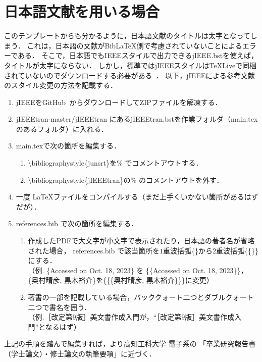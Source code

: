 \chapter{日本語文献を用いる場合}
このテンプレートからも分かるように，日本語文献のタイトルは太字となってしまう．
これは，日本語の文献がBib{\LaTeX}側で考慮されていないことによるエラーである．
そこで，日本語でもIEEEスタイルで出力できるjIEEE.bstを使えば，タイトルが太字にならない．
しかし，標準ではjIEEEスタイルは\TeX Liveで同梱されていないのでダウンロードする必要がある~\cite{jieeetran}．
以下，jIEEEによる参考文献のスタイル変更の方法を記載する．

\begin{enumerate}
    \item jIEEEをGitHub~\cite{jieeetran}からダウンロードしてZIPファイルを解凍する．
    \item jIEEEtran-master/jIEEEtran にあるjIEEEtran.bstを作業フォルダ（main.texのあるフォルダ）に入れる．
    \item main.texで次の箇所を編集する．
        \begin{enumerate}
            \item \textbackslash bibliographystyle\{junsrt\}を\% でコメントアウトする．
            \item \textbackslash bibliographystyle\{jIEEEtran\}の\% のコメントアウトを外す．
        \end{enumerate}
    \item 一度 \LaTeX ファイルをコンパイルする（まだ上手くいかない箇所があるはずだが）．
    \item references.bib で次の箇所を編集する．
        \begin{enumerate}
            \item 作成したPDFで大文字が小文字で表示されたり，日本語の著者名が省略された場合，
                references.bib で該当箇所を$1$重波括弧\{\}から$2$重波括弧\{\{\}\}にする．\\
                （例. \{Accessed on Oct. 18, 2023\} を \{\{Accessed on Oct. 18, 2023\}\}，\\
                    \{奥村晴彦, 黒木裕介\}を\{\{\{奥村晴彦, 黒木裕介\}\}\}に変更）
            \item 著書の一部を記載している場合，バッククォート二つとダブルクォート二つで書名を囲う．\\
                （例.［改定第$9$版］\LaTeXe 美文書作成入門が，``［改定第$9$版］\LaTeXe 美文書作成入門''となるはず）
        \end{enumerate}
\end{enumerate}

上記の手順を踏んで編集すれば，より高知工科大学 電子系の
「卒業研究報告書（学士論文）・修士論文の執筆要項」に近づく．